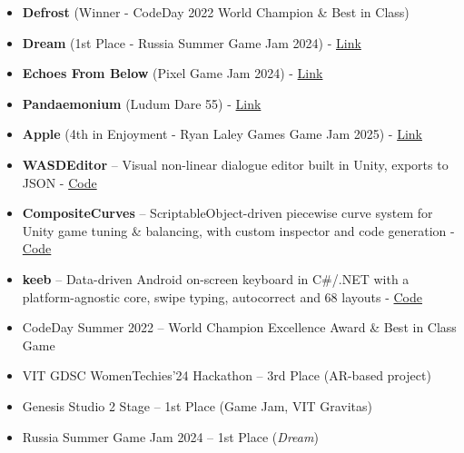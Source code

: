 \documentclass[9pt]{developercv}
\begin{document}
	\begin{itemize}
		\item \textbf{Defrost} (Winner - CodeDay 2022 World Champion \& Best in Class)
		\item \textbf{Dream} (1st Place - Russia Summer Game Jam 2024) - \href{https://graphicmismatch.itch.io/dream}{Link}
		\item \textbf{Echoes From Below} (Pixel Game Jam 2024) - \href{https://rzenn.itch.io/echoes-from-below}{Link}
		\item \textbf{Pandaemonium} (Ludum Dare 55) - \href{https://graphicmismatch.itch.io/pandaemonium}{Link}
		\item \textbf{Apple} (4th in Enjoyment - Ryan Laley Games Game Jam 2025) - \href{https://graphicmismatch.itch.io/apple}{Link}
		\item \textbf{WASDEditor} – Visual non-linear dialogue editor built in Unity, exports to JSON - \href{https://github.com/graphicmismatch/WASDEditor}{Code}
		\item \textbf{CompositeCurves} – ScriptableObject-driven piecewise curve system for Unity game tuning \& balancing, with custom inspector and code generation - \href{https://github.com/graphicmismatch/CompositeCurves}{Code}
		\item \textbf{keeb} – Data-driven Android on-screen keyboard in C\#/.NET with a platform-agnostic core, swipe typing, autocorrect and 68 layouts - \href{https://github.com/graphicmismatch-tools/keeb}{Code}
	\end{itemize}
	
	
	\begin{itemize}
		\item CodeDay Summer 2022 – World Champion Excellence Award \& Best in Class Game
		\item VIT GDSC WomenTechies'24 Hackathon – 3rd Place (AR-based project)
		\item Genesis Studio 2 Stage – 1st Place (Game Jam, VIT Gravitas)
		\item Russia Summer Game Jam 2024 – 1st Place (\textit{Dream})
	\end{itemize}
	
	
\end{document}
